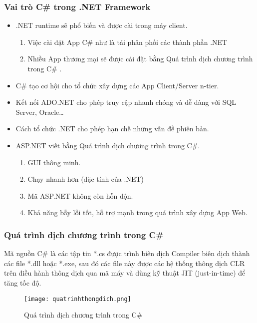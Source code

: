 \subsubsection*{Vai trò C\#  trong .NET Framework}
\begin{itemize}
	\item .NET runtime sẽ phổ biến và được cài trong máy client.
	\begin{enumerate}
		\item Việc cài đặt App C\#  như là tái phân phối các thành phần .NET
		\item Nhiều App thương mại sẽ được cài đặt bằng Quá trình dịch chương trình trong C\# .
	\end{enumerate}
	\item C\# tạo cơ hội cho tổ chức xây dựng các App Client/Server n-tier.
	\item Kết nối ADO.NET cho phép truy cập nhanh chóng và dễ dàng với SQL Server, Oracle…
	\item Cách tổ chức .NET cho phép hạn chế những vấn đề phiên bản.
	\item ASP.NET viết bằng Quá trình dịch chương trình trong C\#.
	\begin{enumerate}
		\item GUI thông minh.
		\item Chạy nhanh hơn (đặc tính của .NET)
		\item Mã ASP.NET không còn hỗn độn.
		\item Khả năng bẫy lỗi tốt, hỗ trợ mạnh trong quá trình xây dựng App Web.
	\end{enumerate}
\end{itemize}

\subsubsection*{Quá trình dịch chương trình trong C\# }
Mã nguồn C\# là các tập tin *.cs được trình biên dịch Compiler biên dịch thành các file *.dll hoặc *.exe, sau đó các file này được các hệ thống thông dịch CLR trên điều hành thông dịch qua mã máy và dùng kỹ thuật JIT (just-in-time) để tăng tốc độ.

\begin{center}
	\begin{figure}[htp]
		\begin{center}
			\texttt{[image: quatrinhthongdich.png]}
		\end{center}
		\caption{Quá trình dịch chương trình trong C\#}
		
	\end{figure}
\end{center}

